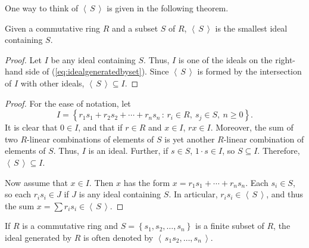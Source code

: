 \documentclass[english,course]{lecture}
\renewcommand{\ge}{\geqslant}
\newcommand{\ideal}[1]{\left\langle\, #1 \,\right\rangle}
\newenvironment{hint}{\startimportant}{}
\def\startimportant#1\end{[{Hint:} #1]\end}
\theoremstyle{plain}
\def\set#1{\left\{ {#1} \right\}}
\def\setof#1#2{{\left\{#1\,\colon\,#2\right\}}}
\def\presnotes{}
\begin{document}
One way to think of $\ideal{S}$ is given in the following theorem.

\begin{theorem}
	Given a commutative ring $R$ and a subset $S$ of $R$, $\ideal{S}$ is the smallest ideal containing $S$.
\end{theorem}

\begin{proof}
	Let $I$ be any ideal containing $S$.
	Thus, $I$ is one of the ideals on the right-hand side of (\ref{eq:idealgeneratedbyset}).
	Since $\ideal{S}$ is formed by the intersection of $I$ with other ideals, $\ideal{S}\subseteq I$.
\end{proof}



\begin{proof}
	For the ease of notation, let 
	\[
		I= \setof{r_1 s_1 + r_2 s_2 + \cdots + r_n s_n}{r_i\in R, \ s_j \in S,\ n\ge 0}.
	\]
	It is clear that $0\in I$, and that if $r\in R$ and $x\in I$, $rx\in I$.
	Moreover, the sum of two $R$-linear combinations of elements of $S$ is yet another $R$-linear combination of elements of $S$.
	Thus, $I$ is an ideal.
	Further, if $s\in S$, $1\cdot s \in I$, so $S\subseteq I$.
	Therefore, $\ideal{S}\subseteq I$.
	
	Now assume that $x\in I$.
	Then $x$ has the form $x = r_1 s_1 + \cdots + r_n s_n$.
	Each $s_i \in S$, so each $r_i s_i \in J$ if $J$ is any ideal containing $S$.
	In articular, $r_i s_i \in \ideal{S}$, and thus the sum $x = \sum r_i s_i \in \ideal{S}$.
\end{proof}


\begin{notation}
	If $R$ is a commutative ring and $S = \set{s_1, s_2, \ldots, s_n}$ is a finite subset of $R$, the ideal generated by $R$ is often denoted by $\ideal{s_1 s_2, \ldots, s_n}$.
\end{notation}
\end{document}
